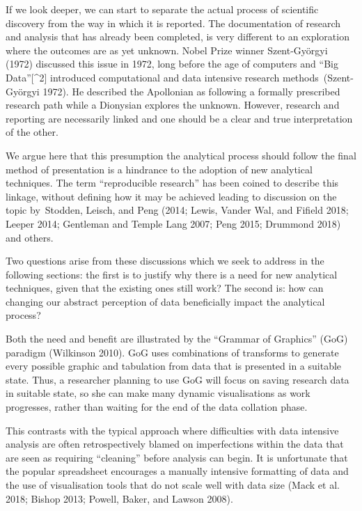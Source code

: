 \documentclass[smallextended]{svjour3}       %
\begin{document}
If we look deeper, we can start to separate the actual process of
scientific discovery from the way in which it is reported. The
documentation of research and analysis that has already been completed,
is very different to an exploration where the outcomes are as yet
unknown. Nobel Prize winner Szent-Györgyi (1972) discussed this issue in
1972, long before the age of computers and ``Big Data''{[}\^{}2{]}
introduced computational and data intensive research
methods~(Szent-Györgyi 1972). He described the Apollonian as following a
formally prescribed research path while a Dionysian explores the
unknown. However, research and reporting are necessarily linked and one
should be a clear and true interpretation of the other.

We argue here that this presumption the analytical process should follow
the final method of presentation is a hindrance to the adoption of new
analytical techniques. The term ``reproducible research'' has been
coined to describe this linkage, without defining how it may be achieved
leading to discussion on the topic by~Stodden, Leisch, and Peng (2014;
Lewis, Vander Wal, and Fifield 2018; Leeper 2014; Gentleman and Temple
Lang 2007; Peng 2015; Drummond 2018) and others.

Two questions arise from these discussions which we seek to address in
the following sections: the first is to justify why there is a need for
new analytical techniques, given that the existing ones still work? The
second is: how can changing our abstract perception of data beneficially
impact the analytical process?

Both the need and benefit are illustrated by the ``Grammar of Graphics''
(GoG) paradigm (Wilkinson 2010). GoG uses combinations of transforms to
generate every possible graphic and tabulation from data that is
presented in a suitable state. Thus, a researcher planning to use GoG
will focus on saving research data in suitable state, so she can make
many dynamic visualisations as work progresses, rather than waiting for
the end of the data collation phase.

This contrasts with the typical approach where difficulties with data
intensive analysis are often retrospectively blamed on imperfections
within the data that are seen as requiring ``cleaning'' before analysis
can begin. It is unfortunate that the popular spreadsheet encourages a
manually intensive formatting of data and the use of visualisation tools
that do not scale well with data size (Mack et al. 2018; Bishop 2013;
Powell, Baker, and Lawson 2008).
\end{document}
